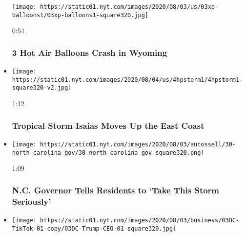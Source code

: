 \begin{itemize}
  \texttt{[image: https://static01.nyt.com/images/2020/08/03/us/03xp-balloons1/03xp-balloons1-square320.jpg]}

  0:54

  \hypertarget{3-hot-air-balloons-crash-in-wyoming}{%
  \subsubsection{3 Hot Air Balloons Crash in
  Wyoming}\label{3-hot-air-balloons-crash-in-wyoming}}
\item
  \href{https://www.nytimes.com/video/us/100000007271735/tropical-storm-isaias-carolinas.html?action=click\&module=video-series-bar\&region=header\&pgtype=Article\&playlistId=video/latest-video}{}

  \texttt{[image: https://static01.nyt.com/images/2020/08/04/us/4hpstorm1/4hpstorm1-square320-v2.jpg]}

  1:12

  \hypertarget{tropical-storm-isaias-moves-up-the-east-coast}{%
  \subsubsection{Tropical Storm Isaias Moves Up the East
  Coast}\label{tropical-storm-isaias-moves-up-the-east-coast}}
\item
  \href{https://www.nytimes.com/video/us/100000007271090/north-carolina-isaias-coronavirus.html?action=click\&module=video-series-bar\&region=header\&pgtype=Article\&playlistId=video/latest-video}{}

  \texttt{[image: https://static01.nyt.com/images/2020/08/03/autossell/30-north-carolina-gov/30-north-carolina-gov-square320.png]}

  1:09

  \hypertarget{nc-governor-tells-residents-to-take-this-storm-seriously}{%
  \subsubsection{N.C. Governor Tells Residents to `Take This Storm
  Seriously'}\label{nc-governor-tells-residents-to-take-this-storm-seriously}}
\item
  \href{https://www.nytimes.com/video/us/100000007270771/trump-tiktok-shutdown-microsoft.html?action=click\&module=video-series-bar\&region=header\&pgtype=Article\&playlistId=video/latest-video}{}

  \texttt{[image: https://static01.nyt.com/images/2020/08/03/business/03DC-TikTok-01-copy/03DC-Trump-CEO-01-square320.jpg]}


\end{itemize}
